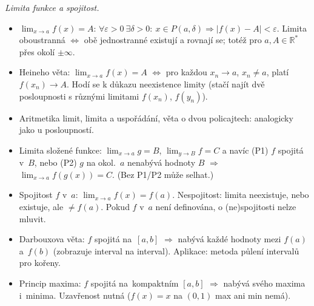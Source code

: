 \documentclass[11pt,a4paper]{article}
\begin{document}
\begin{poznamka}
\smallskip
\emph{Limita funkce a spojitost.}
\begin{itemize}
  \item $\lim_{x\to a}f(x)=A$: $\forall\varepsilon>0\ \exists\delta>0:\ x\in P(a,\delta)\Rightarrow|f(x)-A|<\varepsilon$. Limita oboustranná $\iff$ obě jednostranné existují a rovnají se; totéž pro $a,A\in\mathbb{R}^*$ přes okolí $\pm\infty$.
  \item Heineho věta: $\lim_{x\to a}f(x)=A$ $\iff$ pro každou $x_n\to a$, $x_n\neq a$, platí $f(x_n)\to A$. Hodí se k důkazu neexistence limity (stačí najít dvě posloupnosti s různými limitami $f(x_n)$, $f(y_n)$).
  \item Aritmetika limit, limita a uspořádání, věta o dvou policajtech: analogicky jako u posloupností.
  \item Limita složené funkce: $\lim_{x\to a}g=B$, $\lim_{y\to B}f=C$ a navíc (P1) $f$ spojitá v~$B$, nebo (P2) $g$ na okol.\ $a$ nenabývá hodnoty $B$ $\Rightarrow$ $\lim_{x\to a}f(g(x))=C$. (Bez P1/P2 může selhat.)
  \item Spojitost $f$ v~$a$: $\lim_{x\to a}f(x)=f(a)$. Nespojitost: limita neexistuje, nebo existuje, ale $\neq f(a)$. Pokud $f$ v~$a$ není definována, o (ne)spojitosti nelze mluvit.
  \item Darbouxova věta: $f$ spojitá na~$[a,b]$ $\Rightarrow$ nabývá každé hodnoty mezi $f(a)$ a~$f(b)$ (zobrazuje interval na interval). Aplikace: metoda půlení intervalů pro kořeny.
  \item Princip maxima: $f$ spojitá na~kompaktním $[a,b]$ $\Rightarrow$ nabývá svého maxima i~minima. Uzavřenost nutná ($f(x)=x$ na $(0,1)$ max ani min nemá).
\end{itemize}


\end{poznamka}
\end{document}

